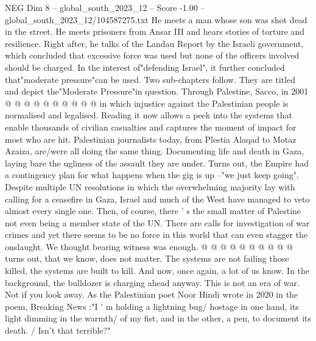 \begin{textsample}{NEG Dim 8 – global\_south\_2023\_12 – Score -1.00 – global\_south\_2023\_12/104587275.txt}
He meets a man whose son was shot dead in the street.
He meets prisoners from Ansar III and hears stories of torture and resilience.
Right after, he talks of the Landau Report by the Israeli government, which concluded that excessive force was used but none of the officers involved should be charged.
In the interest of"defending Israel", it further concluded that"moderate pressure"can be used.
Two sub-chapters follow.
They are titled and depict the"Moderate Pressure"in question.
Through Palestine, Sacco, in 2001 @ @ @ @ @ @ @ @ @ @ in which injustice against the Palestinian people is normalised and legalised.
Reading it now allows a peek into the systems that enable thousands of civilian casualties and captures the moment of impact for most who are hit.
Palestinian journalists today, from Plestia Alaqad to Motaz Azaiza, are/were all doing the same thing.
Documenting life and death in Gaza, laying bare the ugliness of the assault they are under.
Turns out, the Empire had a contingency plan for what happens when the gig is up --"we just keep going".
Despite multiple UN resolutions in which the overwhelming majority lay with calling for a ceasefire in Gaza, Israel and much of the West have managed to veto almost every single one.
Then, of course, there ' s the small matter of Palestine not even being a member state of the UN.
There are calls for investigation of war crimes and yet there seems to be no force in this world that can even stagger the onslaught.
We thought bearing witness was enough. @ @ @ @ @ @ @ @ @ @ turns out, that we know, does not matter.
The systems are not failing those killed, the systems are built to kill.
And now, once again, a lot of us know.
In the background, the bulldozer is charging ahead anyway.
This is not an era of war.
Not if you look away.
As the Palestinian poet Noor Hindi wrote in 2020 in the poem, Breaking News :"I ' m holding a lightning bug/ hostage in one hand, its light dimming in the warmth/ of my fist, and in the other, a pen, to document its death. / Isn't that terrible?"

\end{textsample}
